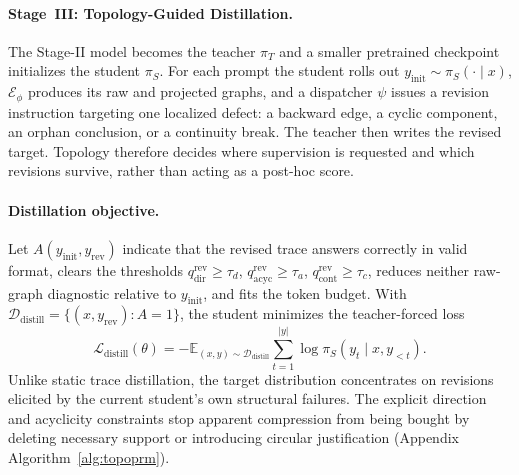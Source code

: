 \paragraph{Stage~III: Topology-Guided Distillation.}
\label{sec:distillation}
The Stage-II model becomes the teacher $\pi_T$ and a smaller pretrained checkpoint initializes the student $\pi_S$. For each prompt the student rolls out $y_{\mathrm{init}}\!\sim\!\pi_S(\cdot\!\mid\!x)$, $\mathcal{E}_{\phi}$ produces its raw and projected graphs, and a dispatcher $\psi$ issues a revision instruction targeting one localized defect: a backward edge, a cyclic component, an orphan conclusion, or a continuity break. The teacher then writes the revised target. Topology therefore decides where supervision is requested and which revisions survive, rather than acting as a post-hoc score.

\paragraph{Distillation objective.}
Let $A(y_{\mathrm{init}},y_{\mathrm{rev}})$ indicate that the revised trace answers correctly in valid format, clears the thresholds $q_{\mathrm{dir}}^{\mathrm{rev}}\!\ge\!\tau_d$, $q_{\mathrm{acyc}}^{\mathrm{rev}}\!\ge\!\tau_a$, $q_{\mathrm{cont}}^{\mathrm{rev}}\!\ge\!\tau_c$, reduces neither raw-graph diagnostic relative to $y_{\mathrm{init}}$, and fits the token budget. With $\mathcal{D}_{\mathrm{distill}}=\{(x,y_{\mathrm{rev}}):A=1\}$, the student minimizes the teacher-forced loss
\begin{equation}
\label{eq:distillation}
\mathcal{L}_{\mathrm{distill}}(\theta)=
-\mathbb{E}_{(x,y)\sim\mathcal{D}_{\mathrm{distill}}}
\sum_{t=1}^{|y|}\log \pi_S(y_t\mid x,y_{<t}).
\end{equation}
Unlike static trace distillation, the target distribution concentrates on revisions elicited by the current student's own structural failures. The explicit direction and acyclicity constraints stop apparent compression from being bought by deleting necessary support or introducing circular justification (Appendix Algorithm~\ref{alg:topoprm}).
